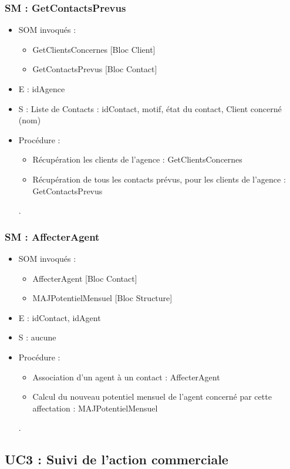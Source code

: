 \subsubsection{SM : GetContactsPrevus}
\begin{itemize}
	\item SOM invoqués : 
	\begin{itemize}
		\item GetClientsConcernes [Bloc Client]
		\item GetContactsPrevus [Bloc Contact]
	\end{itemize}
	\item E : idAgence
	\item S : Liste de Contacts : idContact, motif, état du contact, Client concerné (nom)
	\item Procédure : 
	\begin{itemize}
		\item Récupération les clients de l’agence : GetClientsConcernes 
		\item Récupération de tous les contacts prévus, pour les clients de l’agence : GetContactsPrevus
	\end{itemize}.
\end{itemize}

\subsubsection{SM : AffecterAgent}
\begin{itemize}
	\item SOM invoqués : 
	\begin{itemize}
		\item AffecterAgent [Bloc Contact]
		\item MAJPotentielMensuel [Bloc Structure]
	\end{itemize}
	\item E : idContact, idAgent
	\item S : aucune
	\item Procédure : 
	\begin{itemize}
		\item Association d’un agent à un contact : AffecterAgent
		\item Calcul du nouveau potentiel mensuel de l’agent concerné par cette affectation : MAJPotentielMensuel
	\end{itemize}.
\end{itemize}




\subsection{UC3 : Suivi de l’action commerciale}

